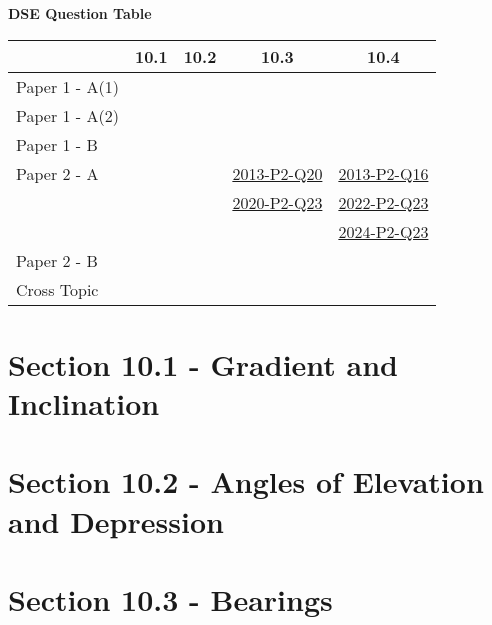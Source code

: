 \documentclass[12pt, a4paper]{article}
\begin{document}
\begin{absolutelynopagebreak}
\begin{center}
\textbf{DSE Question Table}
\end{center}
\begin{center}
\begin{tabular}{|l|c|c|c|c|}
\hline
        & 10.1 & 10.2 & 10.3 & 10.4 \\\hline
\hline
Paper 1 - A(1)&  &  &  &  \\
\hline
Paper 1 - A(2)&  &  &  &  \\
\hline
Paper 1 - B&  &  &  &  \\
\hline
\hline
Paper 2 - A&  &  & \hyperref[DSE2013-CoreP2-Q20]{2013-P2-Q20} & \hyperref[DSE2013-CoreP2-Q16]{2013-P2-Q16} \\
&  &  & \hyperref[DSE2020-CoreP2-Q23]{2020-P2-Q23} & \hyperref[DSE2022-CoreP2-Q23]{2022-P2-Q23} \\
&  &  &  & \hyperref[DSE2024-CoreP2-Q23]{2024-P2-Q23} \\
\hline
Paper 2 - B&  &  &  &  \\
\hline
\hline
Cross Topic&  &  &  &  \\
\hline
\end{tabular}
\end{center}
\end{absolutelynopagebreak}




\section*{Section 10.1 - Gradient and Inclination}\label{section:3-10-1}





\section*{Section 10.2 - Angles of Elevation and Depression}\label{section:3-10-2}





\section*{Section 10.3 - Bearings}\label{section:3-10-3}
\end{document}

